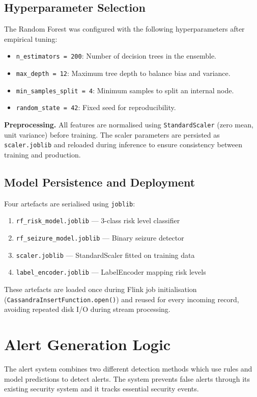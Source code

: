 \documentclass[12pt, a4paper, oneside]{report}
\begin{document}
\subsection{Hyperparameter Selection}
The Random Forest was configured with the following hyperparameters after empirical tuning:
\begin{itemize}
    \item \texttt{n\_estimators = 200}: Number of decision trees in the ensemble.
    \item \texttt{max\_depth = 12}: Maximum tree depth to balance bias and variance.
    \item \texttt{min\_samples\_split = 4}: Minimum samples to split an internal node.
    \item \texttt{random\_state = 42}: Fixed seed for reproducibility.
\end{itemize}

\textbf{Preprocessing.} All features are normalised using \texttt{StandardScaler} (zero mean, unit variance) before training. The scaler parameters are persisted as \texttt{scaler.joblib} and reloaded during inference to ensure consistency between training and production.

\subsection{Model Persistence and Deployment}
Four artefacts are serialised using \texttt{joblib}:
\begin{enumerate}
    \item \texttt{rf\_risk\_model.joblib} --- 3-class risk level classifier
    \item \texttt{rf\_seizure\_model.joblib} --- Binary seizure detector
    \item \texttt{scaler.joblib} --- StandardScaler fitted on training data
    \item \texttt{label\_encoder.joblib} --- LabelEncoder mapping risk levels
\end{enumerate}

These artefacts are loaded once during Flink job initialisation (\texttt{CassandraInsertFunction.open()}) and reused for every incoming record, avoiding repeated disk I/O during stream processing.


\section{Alert Generation Logic}

The alert system combines two different detection methods which use rules and model predictions to detect alerts. The system prevents false alerts through its existing security system and it tracks essential security events.
\end{document}
